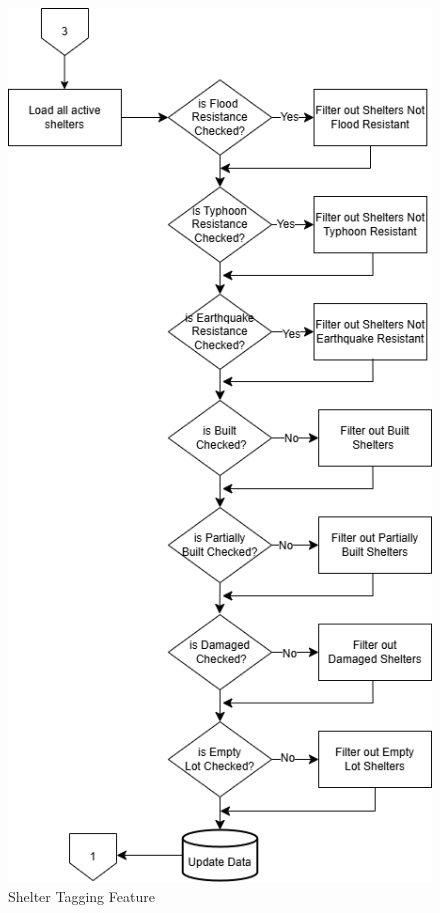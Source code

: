 \begin{appendices}
\begin{centerappendixtitle}
		\begin{figure}[h]
			\centering
			\caption{Shelter Tagging Feature}
			\label{shelTagFlow}
			\includegraphics[scale=0.65]{appendix/sheltertag f}
		\end{figure}
		

\end{centerappendixtitle}
\end{appendices}
